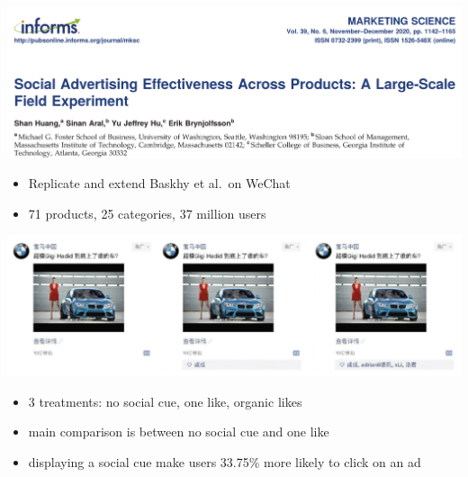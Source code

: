 \documentclass[aspectratio=169]{beamer}
\begin{document}
\begin{frame}

\begin{center}
\includegraphics[width=\textwidth]{figures/huang_social_2020_title}
\end{center}

\vfill
\begin{itemize}
\item Replicate and extend Baskhy et al.\ on WeChat
\item 71 products, 25 categories, 37 million users
\end{itemize}

\end{frame}
\begin{frame}

\begin{center}
\includegraphics[width=\textwidth]{figures/huang_social_2020_fig2}
\end{center}

\begin{itemize}
\item 3 treatments: no social cue, one like, organic likes \pause
\item main comparison is between no social cue and one like \pause
\item displaying a social cue make users 33.75\% more likely to click on an ad
\end{itemize}

\end{frame}
\end{document}
